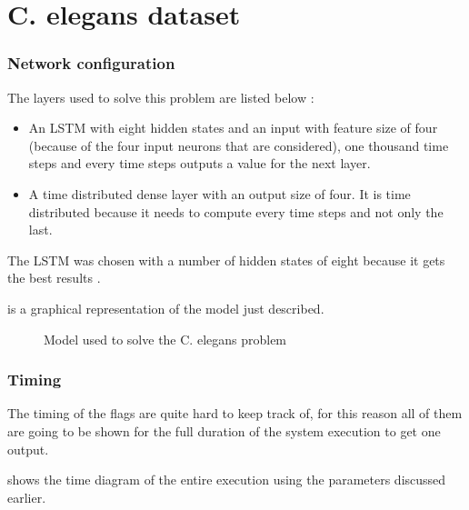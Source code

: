 \section{\acs{C. elegans} dataset}
\label{sec:resCelegans}

\subsubsection{Network configuration}

The layers used to solve this problem are listed below :

\begin{itemize}
  \item An \ac{LSTM} with eight hidden states and an input with feature size of four (because of the four input neurons that are considered), one thousand time steps and every time steps outputs a value for the next layer.
  \item A time distributed dense layer with an output size of four. It is time distributed because it needs to compute every time steps and not only the last.
\end{itemize}

The \ac{LSTM} was chosen with a number of hidden states of eight because it gets the best results \cite{celegans}.

 is a graphical representation of the model just described.

\begin{figure}[H]
  \centering
  
  \caption{Model used to solve the \ac{C. elegans} problem}
  \label{fig:celegansModel}
\end{figure}

\subsubsection{Timing}

The timing of the flags are quite hard to keep track of, for this reason all of them are going to be shown for the full duration of the system execution to get one output.

 shows the time diagram of the entire execution using the parameters discussed earlier.

